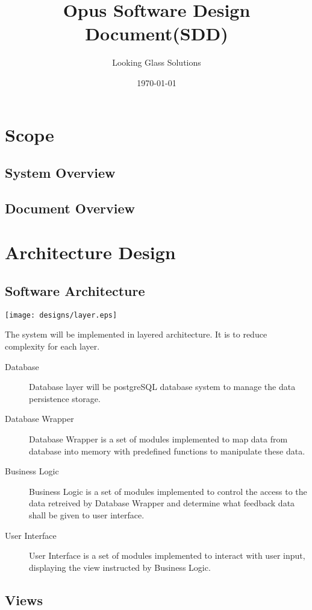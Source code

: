 \documentclass[a4, 11pt]{article}
\title{Opus Software Design Document(SDD)}
\author{Looking Glass Solutions}
\date{\today}
\begin{document}
\maketitle
\tableofcontents
\newpage

\section{Scope}
\subsection{System Overview}
\subsection{Document Overview}

\section{Architecture Design}
\subsection{Software Architecture}
\begin{center}
\texttt{[image: designs/layer.eps]}
\end{center}
The system will be implemented in layered architecture. It is to reduce complexity for each layer.
\begin{description}
	\item[Database] Database layer will be postgreSQL database system to manage the data persistence storage.
	\item[Database Wrapper] Database Wrapper is a set of modules implemented to map data from database into memory with predefined functions to manipulate these data.
	\item[Business Logic] Business Logic is a set of modules implemented to control the access to the data retreived by Database Wrapper and determine what feedback data shall be given to user interface.
	\item[User Interface] User Interface is a set of modules implemented to interact with user input, displaying the view instructed by Business Logic.
\end{description}

\subsection{Views}
\end{document}
